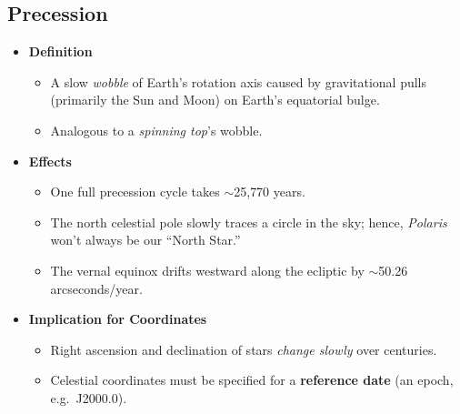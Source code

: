 \subsection{Precession}
\begin{itemize}
  \item \textbf{Definition}
  \begin{itemize}
    \item A slow \emph{wobble} of Earth’s rotation axis caused by gravitational pulls (primarily the Sun and Moon) on Earth’s equatorial bulge.
    \item Analogous to a \emph{spinning top}’s wobble.
  \end{itemize}
  \item \textbf{Effects}
  \begin{itemize}
    \item One full precession cycle takes $\sim$25{,}770 years.
    \item The north celestial pole slowly traces a circle in the sky; hence, \emph{Polaris} won’t always be our ``North Star.''
    \item The vernal equinox drifts westward along the ecliptic by $\sim$50.26 arcseconds/year.
  \end{itemize}
  \item \textbf{Implication for Coordinates}
  \begin{itemize}
    \item Right ascension and declination of stars \emph{change slowly} over centuries.
    \item Celestial coordinates must be specified for a \textbf{reference date} (an epoch, e.g.\ J2000.0).
  \end{itemize}
\end{itemize}

